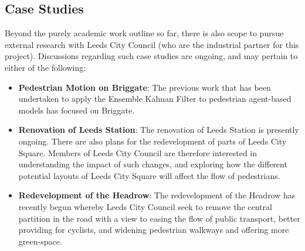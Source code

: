 


\subsection{Case Studies}\label{sub:structure:case_studies}

Beyond the purely academic work outline so far, there is also scope to pursue
external research with Leeds City Council (who are the industrial partner for
this project).
Discussions regarding such case studies are ongoing, and may pertain to either
of the following:
\begin{itemize}
    \item \textbf{Pedestrian Motion on Briggate}: The previous work that has
        been undertaken to apply the Ensemble Kalman Filter to pedestrian
        agent-based models has focused on Briggate. 
    \item \textbf{Renovation of Leeds Station}: The renovation of Leeds Station
        is presently ongoing. There are also plans for the redevelopment of
        parts of Leeds City Square. Members of Leeds City Council are therefore
        interested in understanding the impact of such changes, and exploring
        how the different potential layouts of Leeds City Square will affect the
        flow of pedestrians.
    \item \textbf{Redevelopment of the Headrow}: The redevelopment of the
        Headrow has recently begun whereby Leeds City Council seek to remove the
        central partition in the road with a view to easing the flow of public
        transport, better providing for cyclists, and widening pedestrian
        walkways and offering more green-space.
\end{itemize}
